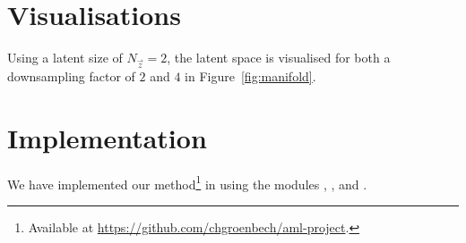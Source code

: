 \chapter{Visualisations}
\label{sec:visualisations}

Using a latent size of $N_{\vec{z}} = 2$, the latent space is visualised for both a downsampling factor of $2$ and $4$ in Figure~\ref{fig:manifold}.

\begin{figure*}
    \centering
    \hspace*{\fill}
    \hfill
    \hspace*{\fill}
    \caption{The learned data manifold for our model latent size of $N_{\vec{z}} = 2$ for both downsampling factors. }
    \label{fig:manifold}
\end{figure*}


\chapter{Implementation}
\label{cha:implementation}

We have implemented our method\footnote{Available at \url{https://github.com/chgroenbech/aml-project}.} in \Python using the modules \Theano, \Lasagne, and \Parmesan.
